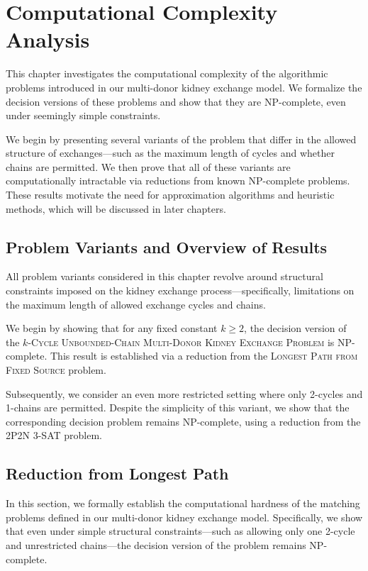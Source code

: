 \chapter{Computational Complexity Analysis}
\label{cha:computational_complexity_analysis}

This chapter investigates the computational complexity of the algorithmic problems introduced in our multi-donor kidney exchange model. We formalize the decision versions of these problems and show that they are NP-complete, even under seemingly simple constraints.

We begin by presenting several variants of the problem that differ in the allowed structure of exchanges—such as the maximum length of cycles and whether chains are permitted. We then prove that all of these variants are computationally intractable via reductions from known NP-complete problems. These results motivate the need for approximation algorithms and heuristic methods, which will be discussed in later chapters.

\section{Problem Variants and Overview of Results}

All problem variants considered in this chapter revolve around structural constraints imposed on the kidney exchange process—specifically, limitations on the maximum length of allowed exchange cycles and chains.

We begin by showing that for any fixed constant $k \ge 2$, the decision version of the \textsc{$k$-Cycle Unbounded-Chain Multi-Donor Kidney Exchange Problem} is NP-complete. This result is established via a reduction from the \textsc{Longest Path from Fixed Source} problem.

Subsequently, we consider an even more restricted setting where only 2-cycles and 1-chains are permitted. Despite the simplicity of this variant, we show that the corresponding decision problem remains NP-complete, using a reduction from the \textsc{2P2N 3-SAT} problem.



\section{Reduction from Longest Path}

In this section, we formally establish the computational hardness of the matching problems defined in our multi-donor kidney exchange model. Specifically, we show that even under simple structural constraints—such as allowing only one 2-cycle and unrestricted chains—the decision version of the problem remains NP-complete. 

